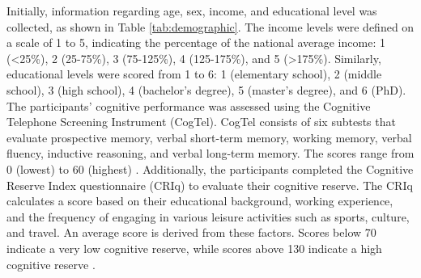 Initially, information regarding age, sex, income, and educational level was collected, as shown in Table \ref{tab:demographic}. The income levels were defined on a scale of 1 to 5, indicating the percentage of the national average income: 1 (<25\%), 2 (25-75\%), 3 (75-125\%), 4 (125-175\%), and 5 (>175\%). Similarly, educational levels were scored from 1 to 6: 1 (elementary school), 2 (middle school), 3 (high school), 4 (bachelor's degree), 5 (master's degree), and 6 (PhD).
The participants' cognitive performance was assessed using the Cognitive Telephone Screening Instrument (CogTel). CogTel consists of six subtests that evaluate prospective memory, verbal short-term memory, working memory, verbal fluency, inductive reasoning, and verbal long-term memory. The scores range from 0 (lowest) to 60 (highest) \cite{Kliegel2007}.
Additionally, the participants completed the Cognitive Reserve Index questionnaire (CRIq) to evaluate their cognitive reserve. The CRIq calculates a score based on their educational background, working experience, and the frequency of engaging in various leisure activities such as sports, culture, and travel. An average score is derived from these factors. Scores below 70 indicate a very low cognitive reserve, while scores above 130 indicate a high cognitive reserve \cite{Nucci2012}.

